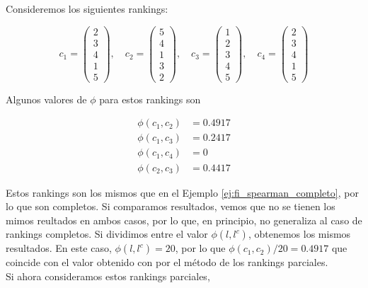 \begin{ejemplo}
Consideremos los siguientes rankings:

\begin{equation*}
c_1 = \left( \begin{array}{c}
2\\
3\\
4\\
1\\
5
\end{array} \right), \quad
c_2 = \left( \begin{array}{c}
5\\
4\\
1\\
3\\
2
\end{array} \right), \quad
c_3 = \left( \begin{array}{c}
1\\
2\\
3\\
4\\
5
\end{array} \right), \quad
c_4 = \left( \begin{array}{c}
2\\
3\\
4\\
1\\
5
\end{array} \right)
\end{equation*}

Algunos valores de $\phi$ para estos rankings son

\begin{align*}
\phi(c_1, c_2) & = 0.4917 \\
\phi(c_1, c_3) & = 0.2417 \\
\phi(c_1, c_4) & = 0\\
\phi(c_2, c_3) & = 0.4417
\end{align*}  

Estos rankings son los mismos que en el Ejemplo \ref{ej:fi_spearman_completo}, por lo que son completos. Si comparamos resultados, vemos que no se tienen los mimos reultados en ambos casos, por lo que, en principio, no generaliza al caso de rankings completos. Si dividimos entre el valor $\phi(l, l^c)$, obtenemos los mismos resultados. En este caso, $\phi(l, l^c) = 20$, por lo que $\phi(c_1, c_2)/20 = 0.4917$ que coincide con el valor obtenido con por el método de los rankings parciales.\\

Si ahora consideramos estos rankings parciales,


\end{ejemplo}
